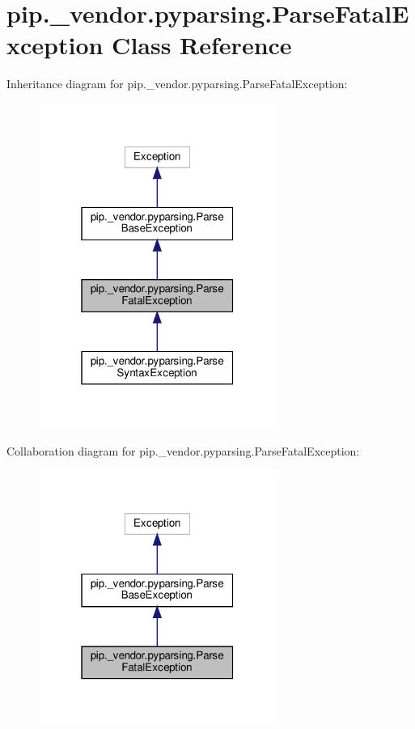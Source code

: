 \hypertarget{classpip_1_1__vendor_1_1pyparsing_1_1ParseFatalException}{}\section{pip.\+\_\+vendor.\+pyparsing.\+Parse\+Fatal\+Exception Class Reference}
\label{classpip_1_1__vendor_1_1pyparsing_1_1ParseFatalException}


Inheritance diagram for pip.\+\_\+vendor.\+pyparsing.\+Parse\+Fatal\+Exception\+:
\nopagebreak
\begin{figure}[H]
\begin{center}
\leavevmode
\includegraphics[width=220pt]{classpip_1_1__vendor_1_1pyparsing_1_1ParseFatalException__inherit__graph}
\end{center}
\end{figure}


Collaboration diagram for pip.\+\_\+vendor.\+pyparsing.\+Parse\+Fatal\+Exception\+:
\nopagebreak
\begin{figure}[H]
\begin{center}
\leavevmode
\includegraphics[width=220pt]{classpip_1_1__vendor_1_1pyparsing_1_1ParseFatalException__coll__graph}
\end{center}
\end{figure}
